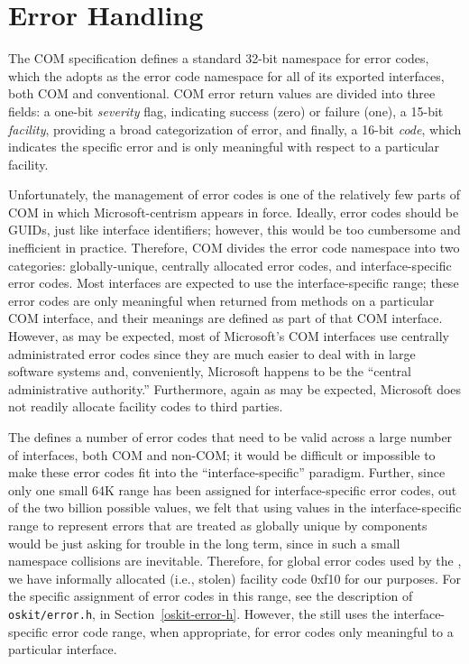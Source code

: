 \section{Error Handling}
\label{com-error-handling}

The COM specification defines a standard 32-bit namespace for error codes,
which the \oskit{} adopts as the error code namespace
for all of its exported interfaces,
both COM and conventional.
COM error return values are divided into three fields:
a one-bit \emph{severity} flag,
indicating success (zero) or failure (one),
a 15-bit \emph{facility},
providing a broad categorization of error,
and finally, a 16-bit \emph{code},
which indicates the specific error
and is only meaningful with respect to a particular facility.

Unfortunately,
the management of error codes is one of the relatively few parts of COM
in which Microsoft-centrism appears in force.
Ideally, error codes should be GUIDs, just like interface identifiers;
however, this would be too cumbersome and inefficient in practice.
Therefore, COM divides the error code namespace into two categories:
globally-unique, centrally allocated error codes,
and interface-specific error codes.
Most interfaces are expected to use the interface-specific range;
these error codes are only meaningful when returned
from methods on a particular COM interface,
and their meanings are defined as part of that COM interface.
However, as may be expected,
most of Microsoft's COM interfaces
use centrally administrated error codes
since they are much easier to deal with in large software systems
and, conveniently, Microsoft happens to be
the ``central administrative authority.''
Furthermore, again as may be expected,
Microsoft does not readily allocate facility codes to third parties.

The \oskit{} defines a number of error codes
that need to be valid across a large number of interfaces,
both COM and non-COM;
it would be difficult or impossible
to make these error codes fit into the ``interface-specific'' paradigm.
Further, since only one small 64K range
has been assigned for interface-specific error codes,
out of the two billion possible values,
we felt that using values in the interface-specific range
to represent errors that are treated as globally unique by \oskit{} components
would be just asking for trouble in the long term,
since in such a small namespace collisions are inevitable.
Therefore, for global error codes used by the \oskit{},
we have informally allocated (i.e., stolen) facility code 0xf10
for our purposes.
For the specific assignment of error codes in this range,
see the description of \texttt{oskit/error.h},
in Section~\ref{oskit-error-h}.
However, the \oskit{} still uses the interface-specific error code range,
when appropriate, for error codes only meaningful to a particular interface.

